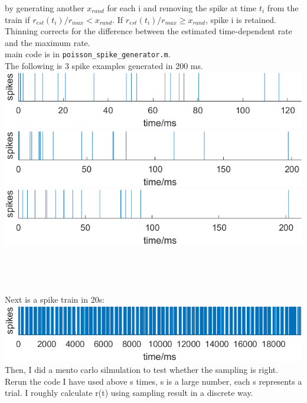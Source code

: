 \documentclass{article}
\begin{document}
\begin{enumerate}
          by generating another $x_{rand}$ for each i and removing the spike at time $t_i$
          from the train if $r_{est}(t_i)/r_{max} < x_{rand}$. If $r_{est}(t_i)/r_{max} \geq x_{rand}$, spike i is retained.
          Thinning corrects for the difference between the estimated time-dependent rate and the maximum rate.\\
          main code is in \texttt{poisson\_spike\_generator.m}.\\
          The following is 3 spike examples generated in 200 ms.\\
          \includegraphics{pics/1_3_1.png}\\
          \includegraphics{pics/1_3_2.png}\\
          \includegraphics{pics/1_3_3.png}\\
          \\
          \\
          \\
          \\
          Next is a spike train in 20s:\\
          \includegraphics{pics/1_3_20s.png}
          Then, I did a mento carlo silmulation to test whether the sampling
          is right. Rerun the code I have used above s times, s is a large number,
          each s represents a trial. I roughly calculate r(t) using sampling result in a discrete way.

\end{enumerate}
\end{document}
